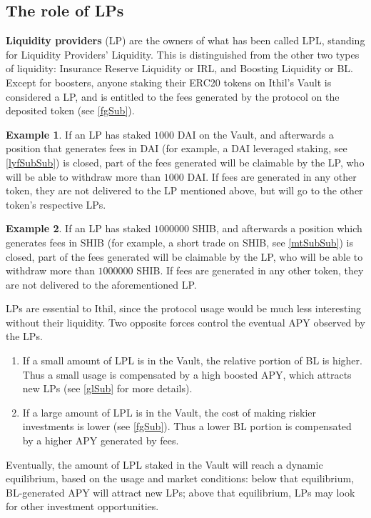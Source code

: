 \documentclass[a4paper,10 pt]{article}
\theoremstyle{definition}
\newtheorem{example}{Example}
\begin{document}
\subsection{The role of LPs}\label{lpSub}
{\bf Liquidity providers} (LP) are the owners of what has been called LPL, standing for Liquidity Providers' Liquidity. This is distinguished from the other two types of liquidity: Insurance Reserve Liquidity or IRL, and Boosting Liquidity or BL. Except for boosters, anyone staking their ERC20 tokens on Ithil's Vault is considered a LP, and is entitled to the fees generated by the protocol on the deposited token (see \ref{fgSub}).

\begin{example}
If an LP has staked $1000$ DAI on the Vault, and afterwards a position that generates fees in DAI (for example, a DAI leveraged staking, see \ref{lyfSubSub}) is closed, part of the fees generated will be claimable by the LP, who will be able to withdraw more than $1000$ DAI. If fees are generated in any other token, they are not delivered to the LP mentioned above, but will go to the other token's respective LPs.
\end{example}

\begin{example}
If an LP has staked $1000000$ SHIB, and afterwards a position which generates fees in SHIB (for example, a short trade on SHIB, see \ref{mtSubSub}) is closed, part of the fees generated will be claimable by the LP, who will be able to withdraw more than $1000000$ SHIB. If fees are generated in any other token, they are not delivered to the aforementioned LP. 
\end{example}

LPs are essential to Ithil, since the protocol usage would be much less interesting without their liquidity. Two opposite forces control the eventual APY observed by the LPs.
\begin{enumerate}
\item If a small amount of LPL is in the Vault, the relative portion of BL is higher. Thus a small usage is compensated by a high boosted APY, which attracts new LPs (see \ref{glSub} for more details).
\item If a large amount of LPL is in the Vault, the cost of making riskier investments is lower (see \ref{fgSub}). Thus a lower BL portion is compensated by a higher APY generated by fees.
\end{enumerate}

Eventually, the amount of LPL staked in the Vault will reach a dynamic equilibrium, based on the usage and market conditions: below that equilibrium, BL-generated APY will attract new LPs; above that equilibrium, LPs may look for other investment opportunities.
\end{document}

